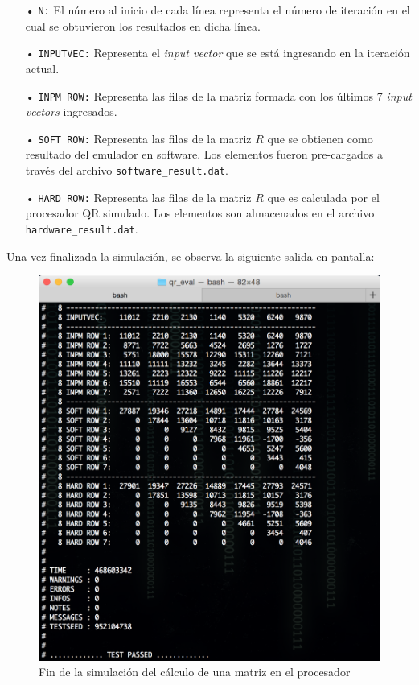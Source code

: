 \begin{itemize}
  \item[•] \verb;N:; El número al inicio de cada línea representa el número de iteración en el cual se obtuvieron los resultados en dicha línea.
  \item[•] \verb;INPUTVEC:; Representa el \textit{input vector} que se está ingresando en la iteración actual.
  \item[•] \verb;INPM ROW:; Representa las filas de la matriz formada con los últimos 7 \textit{input vectors} ingresados.
  \item[•] \verb;SOFT ROW:; Representa las filas de la matriz $R$ que se obtienen como resultado del emulador en software. Los elementos fueron pre-cargados a través del archivo \verb;software_result.dat;.
  \item[•] \verb;HARD ROW:; Representa las filas de la matriz $R$ que es calculada por el procesador QR simulado. Los elementos son almacenados en el archivo \verb;hardware_result.dat;.
\end{itemize}

Una vez finalizada la simulación, se observa la siguiente salida en pantalla:

\begin{figure}[!h]
  \begin{center}
    \includegraphics[width=10 cm]{./figures/C05-qr_eval_terminal_2}
    \caption{Fin de la simulación del cálculo de una matriz en el procesador}
    \label{fig:qr_eval_terminal_2}
  \end{center}
\end{figure}

